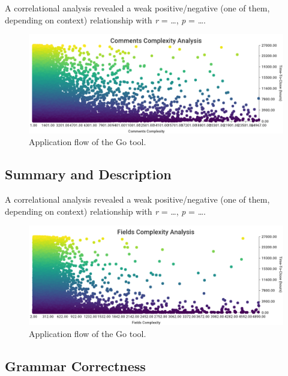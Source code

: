 \documentclass{mpaper}
\begin{document}
A correlational analysis revealed a weak positive/negative (one of them, depending on context) relationship
with \emph{r} = \dots, \emph{p} = \dots.

\begin{figure}
  \begin{center}
  \includegraphics[scale=0.25]{images/comment_complexity.png}
  \end{center}
  \caption{\label{comments}Application flow of the Go tool.}
  \end{figure}

\subsection{Summary and Description}

A correlational analysis revealed a weak positive/negative (one of them, depending on context) relationship
with \emph{r} = \dots, \emph{p} = \dots.

\begin{figure}
  \begin{center}
  \includegraphics[scale=0.25]{images/fields_complexity.png}
  \end{center}
  \caption{\label{fields}Application flow of the Go tool.}
  \end{figure}

\subsection{Grammar Correctness}
\end{document}
